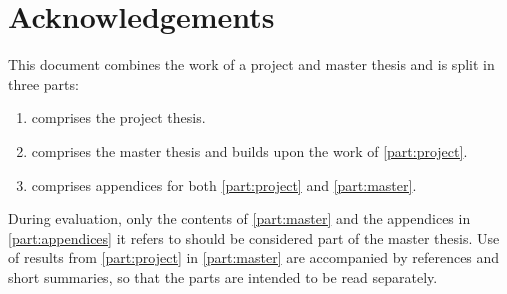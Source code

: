 \chapter*{Acknowledgements}


\begin{tcolorbox}[fonttitle=\bfseries, title=Disclaimer regarding evaluation]
This document combines the work of a project and master thesis and is split in three parts:
\begin{enumerate}
\item {} comprises the project thesis.
\item {} comprises the master thesis and builds upon the work of \cref{part:project}.
\item {} comprises appendices for both \cref{part:project} and \cref{part:master}.
\end{enumerate}
During evaluation, only the contents of \cref{part:master} and the appendices in \cref{part:appendices} it refers to should be considered part of the master thesis.
Use of results from \cref{part:project} in \cref{part:master} are accompanied by references and short summaries, so that the parts are intended to be read separately.
\end{tcolorbox}
